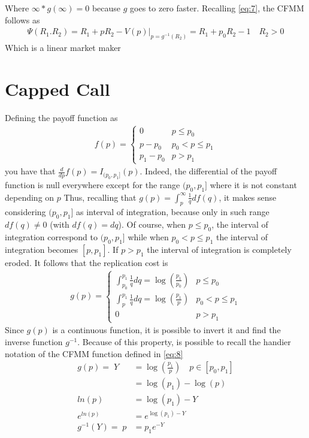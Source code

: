 \documentclass[12pt]{article}
\begin{document}
Where $\infty*g(\infty)=0$ because $g$ goes to zero faster.
\newline Recalling \eqref{eq:7}, the CFMM follows as
\begin{align*}
    \Psi(R_1.R_2) = R_1+pR_2-V(p)|_{p=g^{-1}(R_2)} = R_1 +p_0R_2 -1 \quad R_2>0
\end{align*}
Which is a linear market maker
\section{Capped Call}
Defining the payoff function as
\begin{align*}
    f(p) = \begin{cases}
               0       & p\leq p_0     \\
               p-p_0   & p_0<p\leq p_1 \\
               p_1-p_0 & p>p_1
           \end{cases}
\end{align*}
you have that $\frac{d}{dp}f(p)=I_{(p_0,p_1]}(p)$. Indeed, the differential of the payoff function is null everywhere except for the range $(p_0,p_1]$ where it is not constant depending on $p$
Thus, recalling that $g(p)=\int_p^\infty \frac{1}{q}df(q)$, it makes sense considering $(p_0,p_1]$ as interval of integration, because only in such range $df(q)\neq 0$ (with $df(q)=dq$).
Of course, when $p\leq p_0$, the interval of integration correspond to $(p_0,p_1]$ while when $p_0<p\leq p_1$ the interval of integration becomes $[p,p_1]$. If $p>p_1$ the interval of integration is completely eroded.
It follows that the replication cost is
\begin{align*}
    g(p)=\begin{cases}
             \int_{p_0}^{p_1} \frac{1}{q}dq = \log(\frac{p_1}{p_0}) & p\leq p_0     \\
             \int_{p}^{p_1} \frac{1}{q}dq = \log(\frac{p_1}{p})     & p_0<p\leq p_1 \\
             0                                                      & p>p_1
         \end{cases}
\end{align*}
Since $g(p)$ is a continuous function, it is possible to invert it and find the inverse function $g^{-1}$. Because of this property, is possible to recall the handier notation of the CFMM function defined in \eqref{eq:8}
\begin{align*}
    g(p) =\;  Y   & = \log\left(\frac{p_1}{p}\right)\quad p\in[p_0,p_1] \\
                  & = \log(p_1)-\log(p)                                 \\
    ln(p)         & = \log(p_1)-Y                                       \\
    e^{ln(p)}     & = e^{\log(p_1)-Y}                                   \\
    g^{-1}(Y)=\;p & = p_1e^{-Y}                                         \\
\end{align*}
\end{document}

